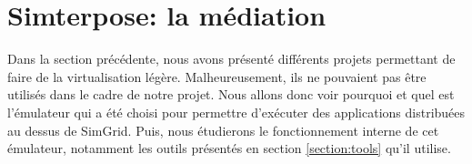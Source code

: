 \section{Simterpose: la médiation}
\label{section:simterpose}

Dans la section précédente, nous avons présenté différents projets permettant de faire de la virtualisation légère. Malheureusement, ils ne pouvaient pas être
utilisés dans le cadre de notre projet. Nous allons donc voir pourquoi et quel
est l'émulateur qui a été choisi pour permettre d'exécuter des applications
distribuées au dessus de SimGrid. Puis, nous étudierons le fonctionnement interne de
cet émulateur, notamment les outils présentés en section \ref{section:tools}
qu'il utilise.
